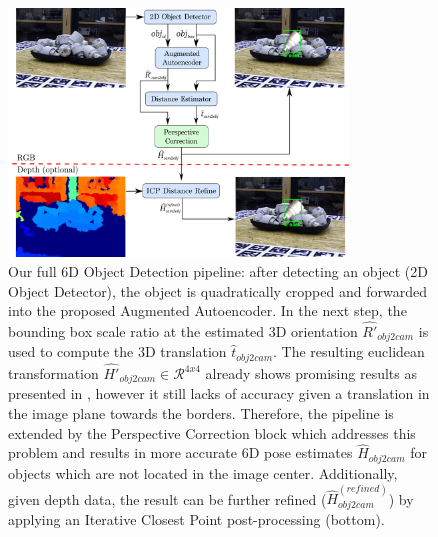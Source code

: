 \begin{figure}[t]%
	\centering
	\captionsetup{width=\textwidth}
	\includegraphics[width=0.805\textwidth]{pipeline_with_scene_vertical_ext.pdf}
	\caption{Our full 6D Object Detection pipeline: after detecting an object (2D Object Detector), the object is quadratically cropped and forwarded into the proposed Augmented Autoencoder. In the next step, the bounding box scale ratio at the estimated 3D orientation $\hat{R'}_{obj2cam}$ is used to compute the 3D translation $\hat{t}_{obj2cam}$. The resulting euclidean transformation $\hat{H'}_{obj2cam}  \in \mathcal{R}^{4x4}$ already shows promising results as presented in \cite{sundermeyer2018implicit}, however it still lacks of accuracy given a translation in the image plane towards the borders. Therefore, the pipeline is extended by the Perspective Correction block which addresses this problem and results in more accurate 6D pose estimates $\hat{H}_{obj2cam}$ for objects which are not located in the image center. Additionally, given depth data, the result can be further refined ($\hat{H}_{obj2cam}^{(refined)}$) by applying an Iterative Closest Point post-processing (bottom).}	\label{fig:pipeline}
\end{figure}

